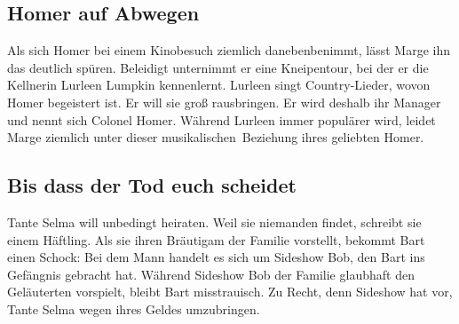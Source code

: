 	
\subsection{Homer auf Abwegen}\label{8F19}
Als sich Homer bei einem Kinobesuch ziemlich danebenbenimmt, lässt Marge ihn das deutlich spüren. Beleidigt unternimmt er eine Kneipentour, bei der er die Kellnerin Lurleen Lumpkin kennenlernt. Lurleen singt Country-Lieder, wovon Homer begeistert ist. Er will sie groß rausbringen. Er wird deshalb ihr Manager und nennt sich Colonel Homer. Während Lurleen immer populärer wird, leidet Marge ziemlich unter dieser \glqq musikalischen\grqq\ Beziehung ihres geliebten Homer.


\subsection{Bis dass der Tod euch scheidet}\label{8F20}
Tante Selma will unbedingt heiraten. Weil sie niemanden findet, schreibt sie einem Häftling. Als sie ihren Bräutigam der Familie vorstellt, bekommt Bart einen Schock: Bei dem Mann handelt es sich um Sideshow Bob, den Bart ins Gefängnis gebracht hat. Während Sideshow Bob der Familie glaubhaft den Geläuterten vorspielt, bleibt Bart misstrauisch. Zu Recht, denn Sideshow hat vor, Tante Selma wegen ihres Geldes umzubringen.

